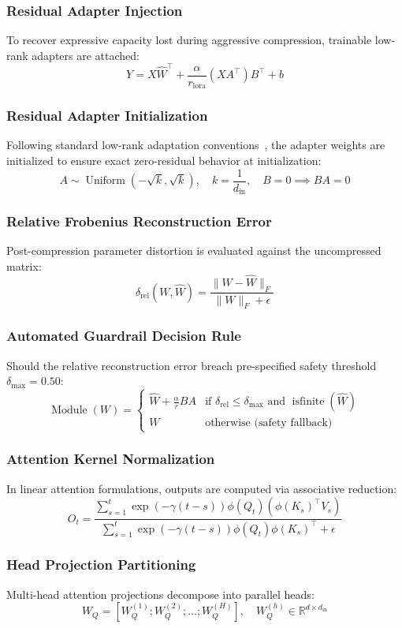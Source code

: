 \subsubsection{Residual Adapter Injection}
To recover expressive capacity lost during aggressive compression, trainable low-rank adapters are attached:
\[
Y = X \hat{W}^\top + \frac{\alpha}{r_{\text{lora}}} (X A^\top) B^\top + b
\]

\subsubsection{Residual Adapter Initialization}
Following standard low-rank adaptation conventions~\citep{hu2022lora}, the adapter weights are initialized to ensure exact zero-residual behavior at initialization:
\[
A \sim \operatorname{Uniform}(-\sqrt{k}, \sqrt{k}), \quad k = \frac{1}{d_{\text{in}}}, \quad B = 0 \implies B A = 0
\]

\subsubsection{Relative Frobenius Reconstruction Error}
Post-compression parameter distortion is evaluated against the uncompressed matrix:
\[
\delta_{\text{rel}}(W, \hat{W}) = \frac{\|W - \hat{W}\|_F}{\|W\|_F + \epsilon}
\]

\subsubsection{Automated Guardrail Decision Rule}
Should the relative reconstruction error breach pre-specified safety threshold $\delta_{\text{max}} = 0.50$:
\[
\operatorname{Module}(W) = \begin{cases} \hat{W} + \frac{\alpha}{r} B A & \text{if } \delta_{\text{rel}} \le \delta_{\text{max}} \text{ and } \operatorname{isfinite}(\hat{W}) \\ W & \text{otherwise (safety fallback)} \end{cases}
\]

\subsubsection{Attention Kernel Normalization}
In linear attention formulations, outputs are computed via associative reduction:
\[
O_t = \frac{\sum_{s=1}^{t} \exp(-\gamma (t-s)) \phi(Q_t) (\phi(K_s)^\top V_s)}{\sum_{s=1}^{t} \exp(-\gamma (t-s)) \phi(Q_t) \phi(K_s)^\top + \epsilon}
\]

\subsubsection{Head Projection Partitioning}
Multi-head attention projections decompose into parallel heads:
\[
W_Q = [W_Q^{(1)}; W_Q^{(2)}; \dots; W_Q^{(H)}], \quad W_Q^{(h)} \in \mathbb{R}^{d \times d_{\text{in}}}
\]

